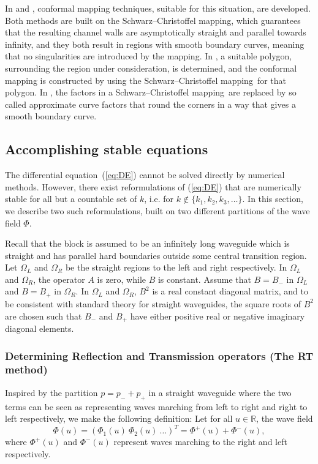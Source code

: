 \documentclass[numreferences]{kluwer}
\renewcommand{\Phi}{\varPhi}
\renewcommand{\vec}[1]{\bm{#1}}
\newcommand{\scm}{Schwarz--Chris\-tof\-fel mapping}
\newcommand{\R}{\mathbb R}
\renewcommand{\Phi}{\varPhi}
\begin{document}
In \cite{andersson-outpol:2008} and \cite{andersson-acf:2009},
conformal mapping techniques, suitable for this situation, are
developed. Both methods are built on the \scm, which guarantees that
the resulting channel walls are asymptotically straight and parallel
towards infinity, and they both result in regions with smooth boundary
curves, meaning that no singularities are introduced by the
mapping. In \cite{andersson-outpol:2008}, a suitable polygon,
surrounding the region under consideration, is determined, and the
conformal mapping is constructed by using the \scm\ for that
polygon. In \cite{andersson-acf:2009}, the factors in a \scm\ are
replaced by so called approximate curve factors that round the corners
in a way that gives a smooth boundary curve.

\subsection{Accomplishing stable equations}
\label{sec:stableeq}
The differential equation~(\ref{eq:DE}) cannot be solved directly by
numerical methods. However, there exist reformulations of
(\ref{eq:DE}) that are numerically stable for all but a countable set
of $k$, i.e. for $k\notin\{k_1,k_2,k_3,\dots\}$. In this section, we
describe two such reformulations, built on two different partitions of
the wave field $\vec\Phi$.

Recall that the block is assumed to be an infinitely long waveguide
which is straight and has parallel hard boundaries outside some
central transition region. Let $\Omega_L$ and $\Omega_R$ be the
straight regions to the left and right respectively.  In $\Omega_L$
and $\Omega_R$, the operator $A$ is zero, while $B$ is
constant. Assume that $B=B_-$ in $\Omega_L$ and $B=B_+$ in
$\Omega_R$. In $\Omega_L$ and $\Omega_R$, $B^2$ is a real constant
diagonal matrix, and to be consistent with standard theory for
straight waveguides, the square roots of $B^2$ are chosen such that
$B_-$ and $B_+$ have either positive real or negative imaginary
diagonal elements.

\subsubsection{Determining Reflection and Transmission operators (The
  RT method)}
\label{sec:RT}

Inspired by the partition $p=p_-+p_+$ in a straight waveguide
where the two terms can be seen as representing waves marching from
left to right and right to left respectively, we make the following
definition: Let for all $u\in\R$, the wave field 
\begin{equation}
  \label{eq:Phipart1}
  \vec\Phi(u)=(\Phi_1(u)\ \Phi_2(u)\ \dots)^T
  =\vec\Phi^+(u)+\vec\Phi^-(u), 
\end{equation}
where $\vec\Phi^+(u)$ and $\vec\Phi^-(u)$ represent waves marching to
the right and left respectively.
\end{document}
